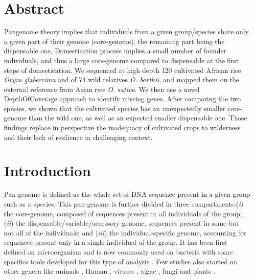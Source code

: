 \documentclass[10pt,letterpaper]{article}
\begin{document}
\section*{Abstract}
Pangenome theory implies that individuals from a given group/species share only a given part of their genome (core-genome), the remaining part being the dispensable one. Domestication process implies a small number of founder individuals, and thus a large core-genome compared to dispensable at the first steps of domestication. We sequenced at high depth 120 cultivated African rice \textit{Oryza glaberrima} and of 74 wild relatives \textit{O. barthii}, and mapped them on the external reference from Asian rice \textit{O. sativa}. We then use a novel DepthOfCoverage approach to identify missing genes. After comparing the two species, we shown that the cultivated species has an unexpectedly smaller core-genome than the wild one, as well as an expected smaller dispensable one. Those findings replace in perspective the inadequacy of cultivated crops to wilderness and their lack of resilience in challenging context.
\linenumbers

\section*{Introduction}
Pan-genome \cite{Tettelin2005} is defined as the whole set of DNA sequence present in a given group such as a species. This pan-genome is further divided in three compartments:(\textit{i}) the core-genome, composed of sequences present in all individuals of the group; (\textit{ii}) the dispensable/variable/accessory-genome, sequences present in some but not all of the individuals; and (\textit{iii}) the individual-specific genome, accounting for sequences present only in a single individual of the group. It has been first defined on microorganism \cite{Tettelin2005} and is now commonly used on bacteria with some specifics tools developed for this type of analysis \cite{Laing2010, Snipen2010, Zhao2012,Sarovich2014, Hennig2015, Thakur2016}. Few studies also started on other genera like animals \cite{Boussaha2015}, Human \cite{Li2010}, viruses \cite{Aherfi2014}, algae \cite{Wang2014a}, fungi \cite{Upadhyaya2015} and plants \cite{Cheung2009, Yao2010, Montenegro2017}.
\end{document}
